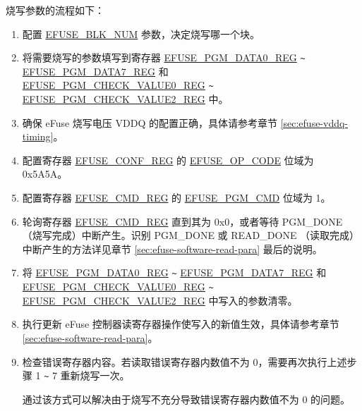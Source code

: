 \documentclass[main\_\_CN.tex]{subfiles}
\begin{document}
烧写参数的流程如下：
\begin{enumerate}
\item 配置 \hyperref[fielddesc:EFUSEBLKNUM]{EFUSE\_BLK\_NUM} 参数，决定烧写哪一个块。

\item 将需要烧写的参数填写到寄存器 \hyperref[regdesc:EFUSEPGMDATANREG]{EFUSE\_PGM\_DATA0\_REG} \verb+~+ \hyperref[regdesc:EFUSEPGMDATANREG]{EFUSE\_PGM\_DATA7\_REG} 和\\ \hyperref[regdesc:EFUSEPGMCHECKVALUENREG]{EFUSE\_PGM\_CHECK\_VALUE0\_REG}  \verb+~+  \hyperref[regdesc:EFUSEPGMCHECKVALUENREG]{EFUSE\_PGM\_CHECK\_VALUE2\_REG} 中。


\item 确保 eFuse 烧写电压 VDDQ 的配置正确，具体请参考章节 \ref{sec:efuse-vddq-timing}。

\item 配置寄存器 \hyperref[regdesc:EFUSECONFREG]{EFUSE\_CONF\_REG} 的 \hyperref[fielddesc:EFUSEOPCODE]{EFUSE\_OP\_CODE} 位域为 0x5A5A。

\item 配置寄存器 \hyperref[regdesc:EFUSECMDREG]{EFUSE\_CMD\_REG} 的 \hyperref[fielddesc:EFUSEPGMCMD]{EFUSE\_PGM\_CMD} 位域为 1。

\item 轮询寄存器 \hyperref[regdesc:EFUSECMDREG]{EFUSE\_CMD\_REG} 直到其为 0x0，或者等待 PGM\_DONE（烧写完成）中断产生。识别 PGM\_DONE 或 READ\_DONE （读取完成）中断产生的方法详见章节 \ref{sec:efuse-software-read-para} 最后的说明。

\item 将 \hyperref[regdesc:EFUSEPGMDATANREG]{EFUSE\_PGM\_DATA0\_REG} \verb+~+ \hyperref[regdesc:EFUSEPGMDATANREG]{EFUSE\_PGM\_DATA7\_REG} 和\\ \hyperref[regdesc:EFUSEPGMCHECKVALUENREG]{EFUSE\_PGM\_CHECK\_VALUE0\_REG}  \verb+~+  \hyperref[regdesc:EFUSEPGMCHECKVALUENREG]{EFUSE\_PGM\_CHECK\_VALUE2\_REG} 中写入的参数清零。

\item 执行更新 eFuse 控制器读寄存器操作使写入的新值生效，具体请参考章节 \ref{sec:efuse-software-read-para}。
\item 检查错误寄存器内容。若读取错误寄存器内数值不为 0，需要再次执行上述步骤 1 \verb+~+ 7 重新烧写一次。

通过该方式可以解决由于烧写不充分导致错误寄存器内数值不为 0 的问题。


\end{enumerate}
\end{document}
